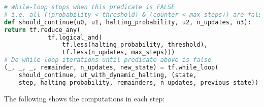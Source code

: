 \begin{lstlisting}[language=Python, caption=UT with dynamic halting.]
# While-loop stops when this predicate is FALSE
# i.e. all ((probability < threshold) & (counter < max_steps)) are false
def should_continue(u0, u1, halting_probability, u2, n_updates, u3):
return tf.reduce_any(
            tf.logical_and(
                tf.less(halting_probability, threshold),
                tf.less(n_updates, max_steps)))
# Do while loop iterations until predicate above is false
(_, _, _, remainder, n_updates, new_state) = tf.while_loop(
    should_continue, ut_with_dynamic_halting, (state, 
    step, halting_probability, remainders, n_updates, previous_state))
\end{lstlisting}







The following shows the computations in each step:

